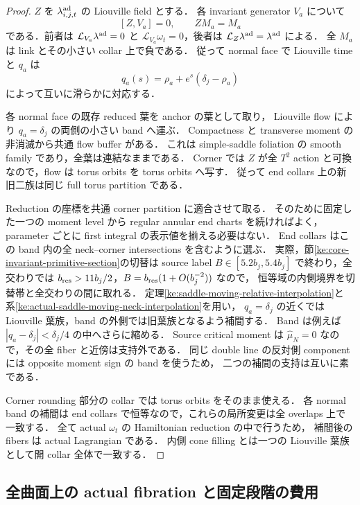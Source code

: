 \begin{proof}
$Z$ を $\lambda^{\rm ad}_{i,j,t}$ の Liouville field とする．
各 invariant generator $V_a$ について
\[
 [Z,V_a]=0,\qquad ZM_a=M_a
\]
である．前者は $\mathcal L_{V_a}\lambda^{\rm ad}=0$ と
$\mathcal L_{V_a}\omega_t=0$，後者は $\mathcal L_Z\lambda^{\rm ad}=\lambda^{\rm ad}$ による．
全 $M_a$ は link とその小さい collar 上で負である．
従って normal face で Liouville time と $q_a$ は
\[
 q_a(s)=\rho_a+e^s(\delta_j-\rho_a)
\]
によって互いに滑らかに対応する．

各 normal face の既存 reduced 葉を anchor の葉として取り，
Liouville flow により $q_a=\delta_j$ の両側の小さい band へ運ぶ．
Compactness と transverse moment の非消滅から共通 flow buffer がある．
これは simple-saddle foliation の smooth family であり，全葉は連結なままである．
Corner では $Z$ が全 $T^2$ action と可換なので，flow は torus orbits を torus orbits へ写す．
従って end collars 上の新旧二族は同じ full torus partition である．

Reduction の座標を共通 corner partition に適合させて取る．
そのために固定した一つの moment level から regular annular end charts を続ければよく，
parameter ごとに first integral の表示値を揃える必要はない．
End collars はこの band 内の全 neck--corner intersections を含むように選ぶ．
実際，節\ref{ke:core-invariant-primitive-section}の切替は source label
$B\in[5.2b_j,5.4b_j]$ で終わり，全交わりでは
$b_{\rm res}>11b_j/2$，$B=b_{\rm res}(1+O(b_j^{-2}))$ なので，
恒等域の内側境界を切替帯と全交わりの間に取れる．
定理\ref{ke:saddle-moving-relative-interpolation}と
系\ref{ke:actual-saddle-moving-neck-interpolation}を用い，
$q_a=\delta_j$ の近くでは Liouville 葉族，band の外側では旧葉族となるよう補間する．
Band は例えば $|q_a-\delta_j|<\delta_j/4$ の中へさらに縮める．
Source critical moment は $\widehat\mu_N=0$ なので，その全 fiber と近傍は支持外である．
同じ double line の反対側 component には opposite moment sign の band を使うため，
二つの補間の支持は互いに素である．

Corner rounding 部分の collar では torus orbits をそのまま使える．
各 normal band の補間は end collars で恒等なので，これらの局所変更は全 overlaps 上で一致する．
全て actual $\omega_t$ の Hamiltonian reduction の中で行うため，
補間後の fibers は actual Lagrangian である．
内側 cone filling とは一つの Liouville 葉族として開 collar 全体で一致する．
\end{proof}

\subsection{全曲面上の actual fibration と固定段階の費用}


